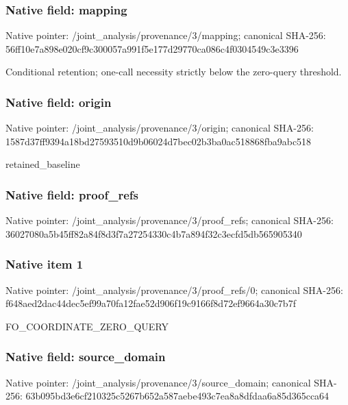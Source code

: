 \documentclass[10pt,a4paper]{article}
\begin{document}
\subsubsection{Native field: mapping}
Native pointer: /joint\_\allowbreak{}analysis/provenance/3/mapping; canonical SHA-256: 56ff10e7a898e020cf9c300057a991f5e177d29770ca086c4f0304549c3e3396

\begingroup\raggedright\sloppy Conditional retention;\allowbreak{} one-call necessity strictly below the zero-query threshold.\par\endgroup

\subsubsection{Native field: origin}
Native pointer: /joint\_\allowbreak{}analysis/provenance/3/origin; canonical SHA-256: 1587d37ff9394a18bd27593510d9b06024d7bec02b3ba0ac518868fba9abc518

\begingroup\raggedright\sloppy retained\_\allowbreak{}baseline\par\endgroup

\subsubsection{Native field: proof\_\allowbreak{}refs}
Native pointer: /joint\_\allowbreak{}analysis/provenance/3/proof\_\allowbreak{}refs; canonical SHA-256: 36027080a5b45ff82a84f8d3f7a27254330c4b7a894f32c3ecfd5db565905340

\subsubsection{Native item 1}
Native pointer: /joint\_\allowbreak{}analysis/provenance/3/proof\_\allowbreak{}refs/0; canonical SHA-256: f648aed2dac44dec5ef99a70fa12fae52d906f19c9166f8d72ef9664a30c7b7f

\begingroup\raggedright\sloppy FO\_\allowbreak{}COORDINATE\_\allowbreak{}ZERO\_\allowbreak{}QUERY\par\endgroup

\subsubsection{Native field: source\_\allowbreak{}domain}
Native pointer: /joint\_\allowbreak{}analysis/provenance/3/source\_\allowbreak{}domain; canonical SHA-256: 63b095bd3e6cf210325c5267b652a587aebe493c7ea8a8dfdaa6a85d365cca64
\end{document}
